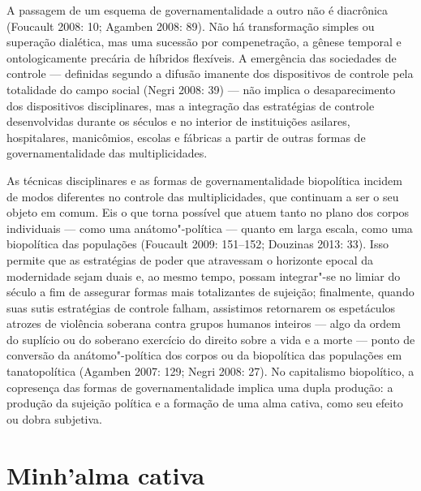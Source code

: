 A passagem de um esquema de governamentalidade a outro não é diacrônica
(Foucault 2008: 10; Agamben 2008: 89). Não há transformação simples ou
superação dialética, mas uma sucessão por compenetração, a gênese
temporal e ontologicamente precária de híbridos flexíveis. A emergência
das sociedades de controle --- definidas segundo a difusão imanente dos
dispositivos de controle pela totalidade do campo social (Negri 2008:
39) --- não implica o desaparecimento dos dispositivos disciplinares, mas
a integração das estratégias de controle desenvolvidas durante os
séculos  e  no interior de instituições asilares, hospitalares,
manicômios, escolas e fábricas a partir de outras formas de
governamentalidade das multiplicidades.

As técnicas disciplinares e as formas de governamentalidade biopolítica
incidem de modos diferentes no controle das multiplicidades, que
continuam a ser o seu objeto em comum. Eis o que torna possível que
atuem tanto no plano dos corpos individuais --- como uma anátomo"-política
--- quanto em larga escala, como uma biopolítica das populações (Foucault
2009: 151--152; Douzinas 2013: 33). Isso permite que as estratégias de
poder que atravessam o horizonte epocal da modernidade sejam duais e, ao
mesmo tempo, possam integrar"-se no limiar do século  a fim de
assegurar formas mais totalizantes de sujeição; finalmente, quando suas
sutis estratégias de controle falham, assistimos retornarem os
espetáculos atrozes de violência soberana contra grupos humanos inteiros
--- algo da ordem do suplício ou do soberano exercício do direito sobre a
vida e a morte --- ponto de conversão da anátomo"-política dos corpos ou
da biopolítica das populações em tanatopolítica (Agamben 2007: 129;
Negri 2008: 27). No capitalismo biopolítico, a copresença das formas
de governamentalidade implica uma dupla produção: a produção da sujeição
política e a formação de uma alma cativa, como seu efeito ou dobra
subjetiva.

\section{Minh'alma cativa}

